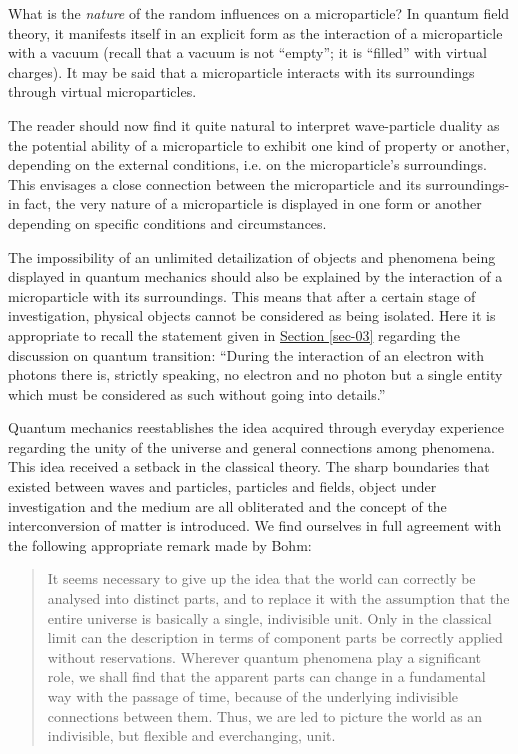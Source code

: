 \documentclass[a4paper,sfsidenotes,colorlinks=true]{tufte-book}
\numberwithin{equation}{section}
\numberwithin{figure}{section}
\begin{document}
What is the \emph{nature} of the random influences on a microparticle? In
quantum field theory, it manifests itself in an explicit form as the
interaction of a microparticle with a vacuum (recall that a vacuum is
not ``empty''; it is ``filled'' with virtual charges). It may be said that
a microparticle interacts with its surroundings through virtual
microparticles.

The reader should now find it quite natural to interpret wave-particle
duality as the potential ability of a microparticle to exhibit one
kind of property or another, depending on the external conditions,
i.e. on the microparticle's surroundings. This envisages a close
connection between the microparticle and its surroundings-in fact, the
very nature of a microparticle is displayed in one form or another
depending on specific conditions and circumstances.

The impossibility of an unlimited detailization of objects and
phenomena being displayed in quantum mechanics should also be
explained by the interaction of a microparticle with its
surroundings. This means that after a certain stage of investigation,
physical objects cannot be considered as being isolated. Here it is
appropriate to recall the statement given in \hyperref[sec-03]{Section
  \ref{sec-03}} regarding the discussion on quantum transition:
``During the interaction of an electron with photons there is,
strictly speaking, no electron and no photon but a single entity which
must be considered as such without going into details.''

Quantum mechanics reestablishes the idea acquired through everyday
experience regarding the unity of the universe and general connections
among phenomena. This idea received a setback in the classical
theory. The sharp boundaries that existed between waves and particles,
particles and fields, object under investigation and the medium are
all obliterated and the concept of the interconversion of matter is
introduced. We find ourselves in full agreement with the following
appropriate remark made by Bohm:
\begin{quote}
  It seems necessary to give up the idea that the world can correctly
  be analysed into distinct parts, and to replace it with the
  assumption that the entire universe is basically a single,
  indivisible unit. Only in the classical limit can the description in
  terms of component parts be correctly applied without
  reservations. Wherever quantum phenomena play a significant role, we
  shall find that the apparent parts can change in a fundamental way
  with the passage of time, because of the underlying indivisible
  connections between them. Thus, we are led to picture the world as
  an indivisible, but flexible and everchanging, unit.\cite{bohm-1951}
\end{quote}
\clearpage
\end{document}
